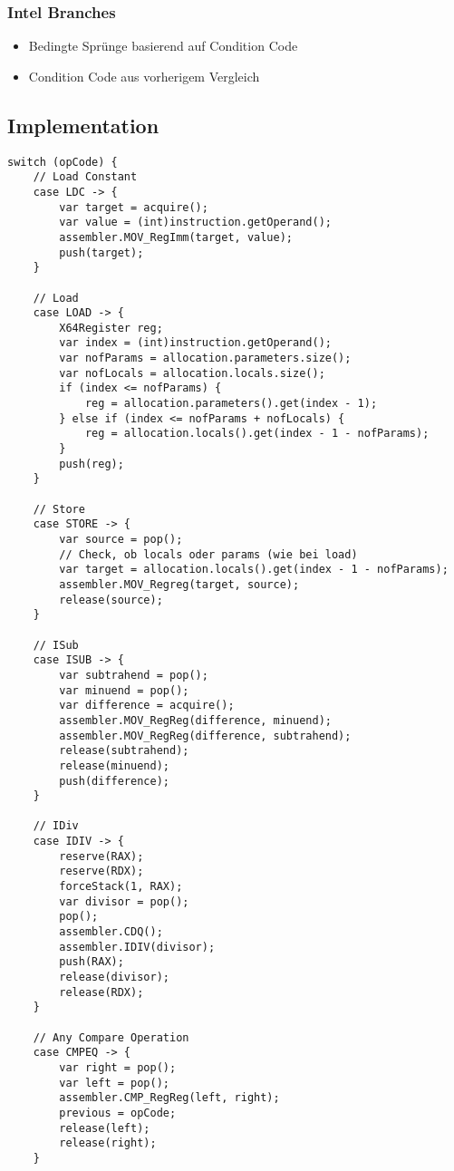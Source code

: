 \subsubsection{Intel Branches}
\begin{itemize}[topsep=0pt]
    \itemsep -0.2em
    \item Bedingte Sprünge basierend auf Condition Code
    \item Condition Code aus vorherigem Vergleich
\end{itemize}

\subsection{Implementation}
\begin{lstlisting}
switch (opCode) {
    // Load Constant
    case LDC -> {
        var target = acquire();
        var value = (int)instruction.getOperand();
        assembler.MOV_RegImm(target, value);
        push(target);
    }

    // Load
    case LOAD -> {
        X64Register reg;
        var index = (int)instruction.getOperand();
        var nofParams = allocation.parameters.size();
        var nofLocals = allocation.locals.size();
        if (index <= nofParams) {
            reg = allocation.parameters().get(index - 1);
        } else if (index <= nofParams + nofLocals) {
            reg = allocation.locals().get(index - 1 - nofParams);
        }
        push(reg);
    }

    // Store
    case STORE -> {
        var source = pop();
        // Check, ob locals oder params (wie bei load)
        var target = allocation.locals().get(index - 1 - nofParams);
        assembler.MOV_Regreg(target, source);
        release(source);
    }

    // ISub
    case ISUB -> {
        var subtrahend = pop();
        var minuend = pop();
        var difference = acquire();
        assembler.MOV_RegReg(difference, minuend);
        assembler.MOV_RegReg(difference, subtrahend);
        release(subtrahend);
        release(minuend);
        push(difference);
    }

    // IDiv
    case IDIV -> {
        reserve(RAX);
		reserve(RDX);
		forceStack(1, RAX);
		var divisor = pop();
		pop();
		assembler.CDQ();
		assembler.IDIV(divisor);
		push(RAX);
		release(divisor);
		release(RDX);
    }

    // Any Compare Operation
    case CMPEQ -> {
        var right = pop();
		var left = pop();
		assembler.CMP_RegReg(left, right);
		previous = opCode;
		release(left);
		release(right);
    }


\end{lstlisting}
